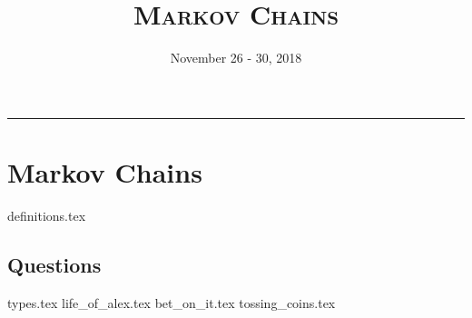 \documentclass{exam}
\title{\textsc{Markov Chains}}
\date{November 26 - 30, 2018}
\begin{document}
\maketitle
\rule{\textwidth}{0.15em}
\fontsize{12}{15}\selectfont
\thispagestyle{empty}

\begin{comment}
\section{Confidence Intervals}
\subsection{Questions}
\begin{questions}
{intro_prob.tex}
{unknown_die.tex}
\end{questions}
\newpage 
\end{comment}

\section{Markov Chains}
{definitions.tex}
\subsection{Questions}
\begin{questions}
{types.tex}
\newpage
{life_of_alex.tex}
\newpage
\newpage
{bet_on_it.tex}
{tossing_coins.tex}
\end{questions}
\end{document}
